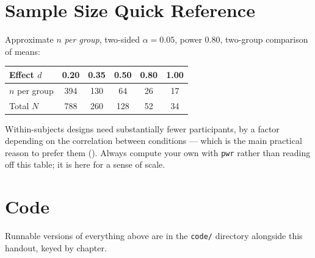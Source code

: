 \section{Sample Size Quick Reference}

Approximate $n$ \emph{per group}, two-sided $\alpha = 0.05$, power 0.80,
two-group comparison of means:

\begin{center}
\small
\begin{tabular}{@{}L{3.0cm}ccccc@{}}
\toprule
Effect $d$        & 0.20 & 0.35 & 0.50 & 0.80 & 1.00 \\
\midrule
$n$ per group     & 394  & 130  & 64   & 26   & 17 \\
Total $N$         & 788  & 260  & 128  & 52   & 34 \\
\bottomrule
\end{tabular}
\end{center}

\noindent Within-subjects designs need substantially fewer participants, by a
factor depending on the correlation between conditions --- which is the main
practical reason to prefer them (). Always compute your own
with \texttt{pwr} rather than reading off this table; it is here for a sense of
scale.

\section{Code}

Runnable versions of everything above are in the \texttt{code/} directory
alongside this handout, keyed by chapter.

